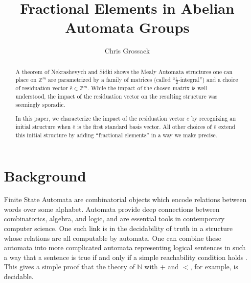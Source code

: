 \documentclass[runningheads]{llncs}
\title{Fractional Elements in Abelian Automata Groups}
\author{Chris Grossack\orcidID{0000-0001-7520-9747}}
\institute%
{%
  Carnegie Mellon University, Pittsburgh, USA\\
  \email{cgrossac@alumni.cmu.edu}
}
\newcommand{\Z}{\mathbb{Z}}
\newcommand{\2}{\textbf{2}}
\newcommand{\e}{\bar{e}}
\begin{document}
\maketitle

\begin{abstract}
  A theorem of Nekrashevych and Sidki shows the Mealy Automata
  structures one can place on $\Z^m$ are parametrized by a family of
  matrices (called ``$\frac{1}{2}$-integral'') and a choice of 
  residuation vector $\e \in \Z^m$. While the impact of the chosen 
  matrix is well understood, the impact of the residuation vector on the
  resulting structure was seemingly sporadic. 

  In this paper, we characterize the impact of the residuation vector $\e$
  by recognizing an initial structure when $\e$ is the first standard basis 
  vector. All other choices of $\e$ extend this initial structure by adding
  ``fractional elements'' in a way we make precise. 

\end{abstract}

\section{Background}
Finite State Automata are combinatorial objects which encode relations 
between words over some alphabet. Automata provide deep connections between
combinatorics, algebra, and logic, and are essential tools in contemporary 
computer science. One such link is in the decidability of truth in a structure
whose relations are all computable by automata. One can combine these automata 
into more complicated automata representing logical sentences in such a way 
that a sentence is true if and only if a simple reachability condition holds
\cite{Brny07:automatic_structures}. This gives a simple proof that the theory 
of $\mathbb{N}$ with $+$ and $<$, for example, is decidable.
\end{document}
